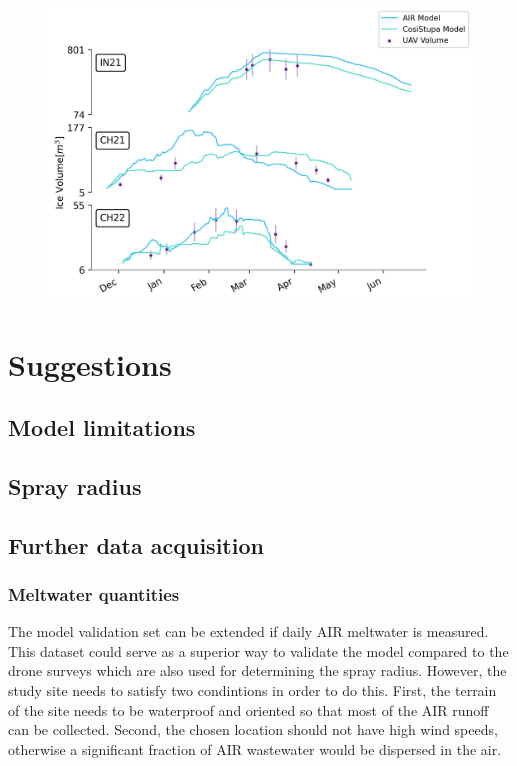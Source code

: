 \begin{figure}[t]
\centering
\includegraphics[width=12cm]{Figures/model_compare.jpg}

\caption{}

\label{fig:Cosistupa}
\end{figure}

\section{Suggestions}

\subsection{Model limitations}

\subsection{Spray radius}

\subsection{Further data acquisition}

\subsubsection{Meltwater quantities}

The model validation set can be extended if daily AIR meltwater is measured. This dataset could serve as a
superior way to validate the model compared to the drone surveys which are also used for determining the spray
radius. However, the study site needs to satisfy two condintions in order to do this. First, the terrain of the
site needs to be waterproof and oriented so that most of the AIR runoff can be collected. Second, the chosen
location should not have high wind speeds, otherwise a significant fraction of AIR wastewater would be dispersed
in the air.

